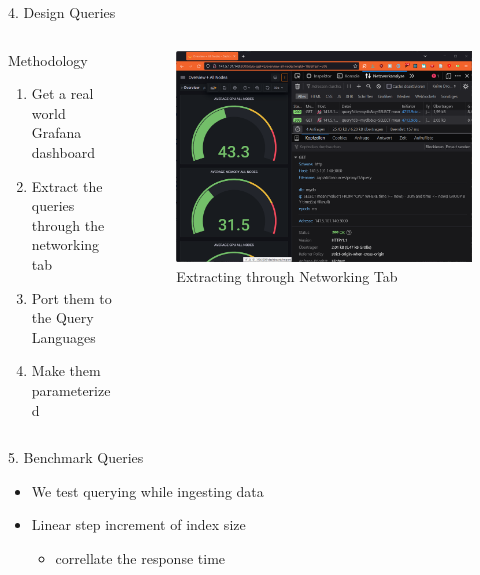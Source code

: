 \documentclass[compress,aspectratio=169]{beamer}
\begin{document}
\begin{frame}{4. Design Queries}
\begin{columns}[T]
\begin{column}{0.5\textwidth}
\begin{block}{Methodology}
\begin{enumerate}
  \item Get a real world Grafana dashboard
  \item Extract the queries through the networking tab
  \item Port them to the Query Languages
  \item Make them parameterized
\end{enumerate}
\end{block}
\end{column}
\begin{column}{0.5\textwidth}
\begin{figure}
  \centering
  \includegraphics[width=\textwidth]{networking.png}
  \caption{Extracting through Networking Tab}
\end{figure}
\end{column}
\end{columns}
\end{frame}

\begin{frame}{5. Benchmark Queries}
\begin{itemize}
  \item We test querying while ingesting data
  \item Linear step increment of index size
  \begin{itemize}
    \item correllate the response time
  \end{itemize}
\end{itemize}
\end{frame}
\end{document}
